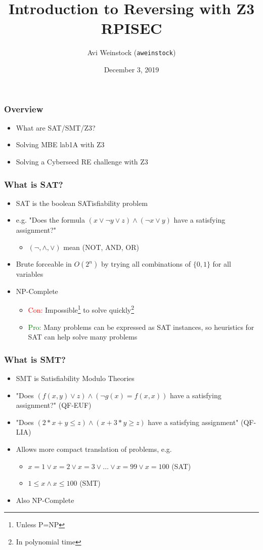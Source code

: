 \documentclass[aspectratio=169]{beamer}
\title{Introduction to Reversing with Z3\\RPISEC}
\date{December 3, 2019}
\author{Avi Weinstock (\Verb|aweinstock|)}
\begin{document}
\maketitle

\begin{frame}[fragile]
\frametitle{Overview}
\begin{itemize}
\item What are SAT/SMT/Z3?
\item Solving MBE lab1A with Z3
\item Solving a Cyberseed RE challenge with Z3
\end{itemize}
\end{frame}

\begin{frame}[fragile]
\frametitle{What is SAT?}
\begin{itemize}
\item SAT is the boolean SATisfiability problem
\item e.g. "Does the formula $(x \lor \neg y \lor z) \land (\neg x \lor y)$ have a satisfying assignment?"
\begin{itemize}
\item $(\neg, \land, \lor)$ mean (NOT, AND, OR)
\end{itemize}
\item Brute forceable in $O(2^n)$ by trying all combinations of $\{0,1\}$ for all variables
\item NP-Complete 
\begin{itemize}
\item \textcolor{red}{Con:} Impossible\footnote{Unless P=NP} to solve quickly\footnote{In polynomial time}
\item \textcolor{green}{Pro:} Many problems can be expressed as SAT instances, so heuristics for SAT can help solve many problems
\end{itemize}
\end{itemize}
\end{frame}

\begin{frame}[fragile]
\frametitle{What is SMT?}
\begin{itemize}
\item SMT is Satisfiability Modulo Theories
\item "Does $(f(x,y) \lor z) \land (\neg g(x) = f(x, x))$ have a satisfying assignment?" (QF-EUF)
\item "Does $(2*x+y \le z) \land (x+3*y \ge z)$ have a satisfying assignment" (QF-LIA)
\item Allows more compact translation of problems, e.g.
\begin{itemize}
\item $x = 1 \lor x = 2 \lor x = 3 \lor \hdots \lor x = 99 \lor x = 100$ (SAT)
\item $1 \le x \land x \le 100$ (SMT)
\end{itemize}
\item Also NP-Complete
\end{itemize}
\end{frame}
\end{document}
